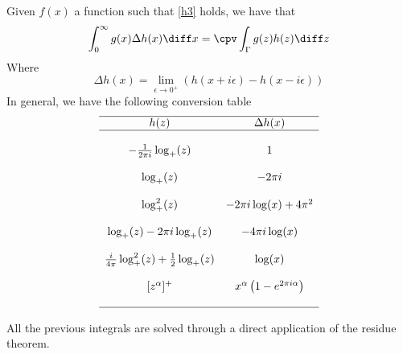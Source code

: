 \documentclass[../mmf.tex]{subfiles}
\begin{document}
\begin{thm}
	Given $f(x)$ a function such that \eqref{h3} holds, we have that
	\begin{equation}
		\int_{0}^{\infty}g(x)\Delta h(x)\diff x=\cpv\int_{\Gamma}^{}g(z)h(z)\diff z
		\label{eq:intpac}
	\end{equation}
	Where
	\begin{equation}
		\Delta h(x)=\lim_{\epsilon\to0^+}\left( h(x+i\epsilon)-h(x-i\epsilon) \right)
		\label{eq:deltahdefcesi}
	\end{equation}
	In general, we have the following conversion table
	\begin{equation}
		\begin{matrix}
			\hline
			h(z)&\Delta h(x)\\
			\hline\\
			-\frac{1}{2\pi i}\log_+(z)&1\\\\
			\log_+(z)&-2\pi i\\\\
			\log_+^2(z)&-2\pi i\log(x)+4\pi^2\\\\
			\log_+(z)-2\pi i\log_+(z)&-4\pi i\log(x)\\\\
			\frac{i}{4\pi}\log_+^2(z)+\frac{1}{2}\log_+(z)&\log(x)\\\\
			[z^\alpha]^+&x^\alpha\left( 1-e^{2\pi i\alpha} \right)\\\\
			\hline
		\end{matrix}
		\label{eq:tableconv}
	\end{equation}
\end{thm}
All the previous integrals are solved through a direct application of the residue theorem.
\end{document}
